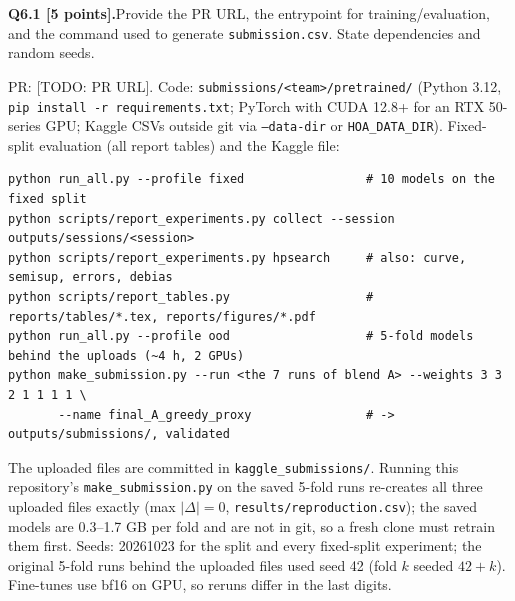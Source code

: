 \documentclass[11pt,letterpaper]{article}
\newcommand{\question}[2]{\needspace{4\baselineskip}\par\addvspace{0.45em}\noindent\textbf{#1}\quad #2\par\nobreak\vspace{0.1em}}
\begin{document}
\question{Q6.1 [5 points].}{Provide the PR URL, the entrypoint for training/evaluation, and the command used to generate \texttt{submission.csv}. State dependencies and random seeds.}
PR: [TODO: PR URL]. Code: \texttt{submissions/<team>/pretrained/} (Python 3.12, \texttt{pip install -r requirements.txt}; PyTorch with CUDA 12.8+ for an RTX 50-series GPU; Kaggle CSVs outside git via \texttt{--data-dir} or \texttt{HOA\_DATA\_DIR}).
Fixed-split evaluation (all report tables) and the Kaggle file:
{\footnotesize\begin{verbatim}
python run_all.py --profile fixed                 # 10 models on the fixed split
python scripts/report_experiments.py collect --session outputs/sessions/<session>
python scripts/report_experiments.py hpsearch     # also: curve, semisup, errors, debias
python scripts/report_tables.py                   # reports/tables/*.tex, reports/figures/*.pdf
python run_all.py --profile ood                   # 5-fold models behind the uploads (~4 h, 2 GPUs)
python make_submission.py --run <the 7 runs of blend A> --weights 3 3 2 1 1 1 1 \
       --name final_A_greedy_proxy                # -> outputs/submissions/, validated
\end{verbatim}}
{\raggedright The uploaded files are committed in \texttt{kaggle\_submissions/}. Running this repository's \texttt{make\_submission.py} on the saved 5-fold runs re-creates all three uploaded files exactly (max $|\Delta| = 0$, \texttt{results/reproduction.csv}); the saved models are 0.3--1.7 GB per fold and are not in git, so a fresh clone must retrain them first.
Seeds: 20261023 for the split and every fixed-split experiment; the original 5-fold runs behind the uploaded files used seed 42 (fold $k$ seeded $42+k$). Fine-tunes use bf16 on GPU, so reruns differ in the last digits.\par}
\end{document}
